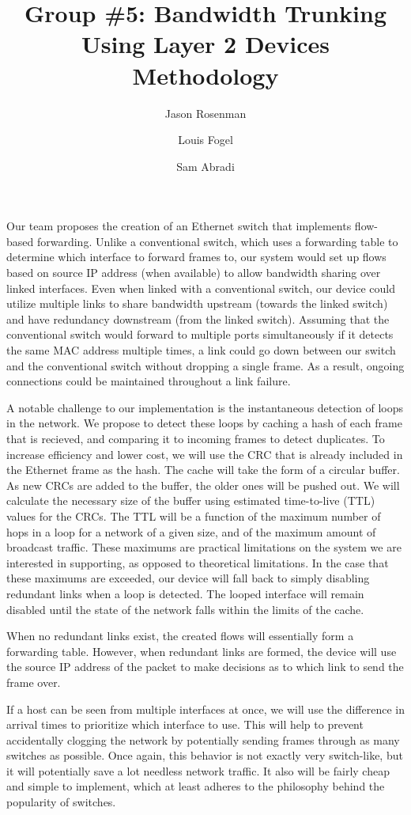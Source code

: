 \documentclass{article}
\title{Group \#5: Bandwidth Trunking Using Layer 2 Devices\\Methodology}
\author{Jason Rosenman \and Louis Fogel \and Sam Abradi}
\date{}
\begin{document}
\maketitle
	Our team proposes the creation of an Ethernet switch that implements flow-based forwarding.
	Unlike a conventional switch, which uses a forwarding table to determine which interface to forward frames to, our system would set up flows based on source IP address (when available) to allow bandwidth sharing over linked interfaces.
	Even when linked with a conventional switch, our device could utilize multiple links to share bandwidth upstream (towards the linked switch) and have redundancy downstream (from the linked switch).
	Assuming that the conventional switch would forward to multiple ports simultaneously if it detects the same MAC address multiple times, a link could go down between our switch and the conventional switch without dropping a single frame.
	As a result, ongoing connections could be maintained throughout a link failure.

	A notable challenge to our implementation is the instantaneous detection of loops in the network.
	We propose to detect these loops by caching a hash of each frame that is recieved, and comparing it to incoming frames to detect duplicates.
	To increase efficiency and lower cost, we will use the CRC that is already included in the Ethernet frame as the hash.
	The cache will take the form of a circular buffer.
	As new CRCs are added to the buffer, the older ones will be pushed out.
	We will calculate the necessary size of the buffer using estimated time-to-live (TTL) values for the CRCs.
	The TTL will be a function of the maximum number of hops in a loop for a network of a given size, and of the maximum amount of broadcast traffic.
	These maximums are practical limitations on the system we are interested in supporting, as opposed to theoretical limitations.
	In the case that these maximums are exceeded, our device will fall back to simply disabling redundant links when a loop is detected.
	The looped interface will remain disabled until the state of the network falls within the limits of the cache.
	
	When no redundant links exist, the created flows will essentially form a forwarding table.
	However, when redundant links are formed, the device will use the source IP address of the packet to make decisions as to which link to send the frame over.

	If a host can be seen from multiple interfaces at once, we will use the difference in arrival times to prioritize which interface to use.
	This will help to prevent accidentally clogging the network by potentially sending frames through as many switches as possible. Once again, this behavior is not exactly very switch-like, but it will potentially save a lot needless network traffic. 
	It also will be fairly cheap and simple to implement, which at least adheres to the philosophy behind the popularity of switches.
\end{document}
